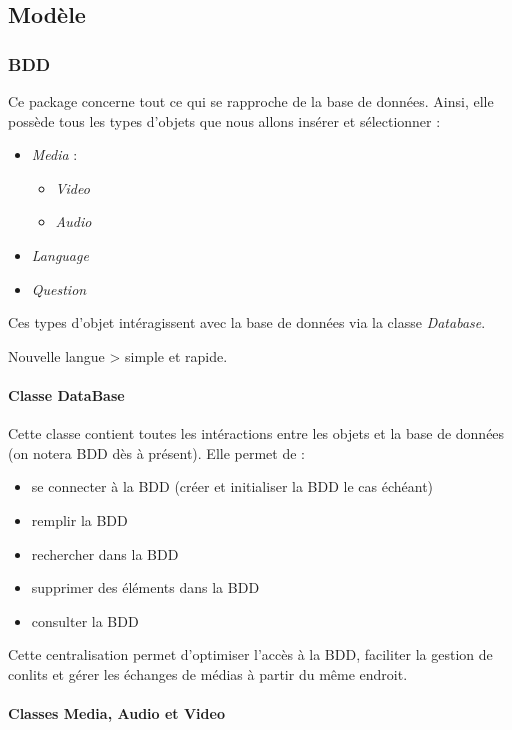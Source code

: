 \subsection{Modèle}\label{modele}


\subsubsection{BDD}

Ce package concerne tout ce qui se rapproche de la base de données. Ainsi, elle possède tous les types d'objets que nous allons insérer et sélectionner :
\begin{itemize}
 \item \textit{Media} :
 \begin{itemize}
  \item \textit{Video}
  \item \textit{Audio}
 \end{itemize}
 \item \textit{Language}
 \item \textit{Question}
\end{itemize}


Ces types d'objet intéragissent avec la base de données via la classe \textit{Database}.

Nouvelle langue > simple et rapide.

\paragraph{Classe DataBase}

Cette classe contient toutes les intéractions entre les objets et la base de données (on notera BDD dès à présent). Elle permet de :

\begin{itemize}
 \item se connecter à la BDD (créer et initialiser la BDD le cas échéant)
 \item remplir la BDD
 \item rechercher dans la BDD
 \item supprimer des éléments dans la BDD
 \item consulter la BDD
\end{itemize}


Cette centralisation permet d'optimiser l'accès à la BDD, faciliter la gestion de conlits et gérer les échanges de médias à partir du même endroit.

\paragraph{Classes Media, Audio et Video}

